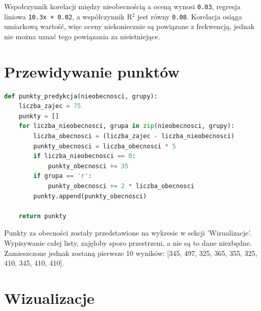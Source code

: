 \documentclass{article}
\begin{document}
\begin{flushleft}
Wspołczynnik korelacji między nieobecnością a oceną wynosi \texttt{0.03}, regresja liniowa \texttt{10.3x + 0.02}, a współczynnik R$^2$ jest równy \texttt{0.08}. Korelacja osiąga umiarkową wartość, więc oceny niekoniecznie są powiązane z frekwencją, jednak nie można uznać tego powiązania za nieistniejące.
\end{flushleft}

\section{Przewidywanie punktów}
\begin{lstlisting}[language=Python]
def punkty_predykcja(nieobecnosci, grupy):
    liczba_zajec = 75
    punkty = []
    for liczba_nieobecnosci, grupa in zip(nieobecnosci, grupy):
        liczba_obecnosci = (liczba_zajec - liczba_nieobecnosci)
        punkty_obecnosci = liczba_obecnosci * 5
        if liczba_nieobecnosci == 0:
            punkty_obecnosci += 35
        if grupa == 'r':
            punkty_obecnosci += 2 * liczba_obecnosci
        punkty.append(punkty_obecnosci)

    return punkty
\end{lstlisting}

\begin{flushleft}
Punkty za obecności zostały przedstawione na wykresie w sekcji 'Wizualizacje'. Wypisywanie całej listy, zajęłoby sporo przestrzeni, a nie są to dane niezbędne. Zamieszczone jednak zostaną pierwsze 10 wyników: [345, 497, 325, 365, 355, 325, 410, 345, 410, 410].
\end{flushleft}
\vspace{7cm}

\section{Wizualizacje}
\end{document}
